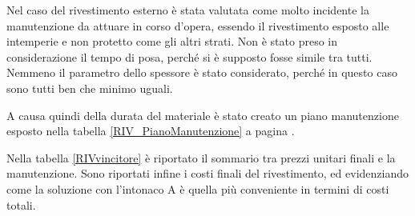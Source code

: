 Nel caso del rivestimento esterno è stata valutata come molto incidente la manutenzione da attuare in corso d'opera, essendo il rivestimento esposto alle intemperie e non protetto come gli altri strati. 
Non è stato preso in considerazione il tempo di posa, perché si è supposto fosse simile tra tutti.
Nemmeno il parametro dello spessore è stato considerato, perché in questo caso sono tutti ben che minimo uguali.

A causa quindi della durata del materiale è stato creato un piano manutenzione esposto nella tabella \ref{RIV_PianoManutenzione} a pagina \pageref{RIV_PianoManutenzione}.

Nella tabella \ref{RIVvincitore} è riportato il sommario tra prezzi unitari finali e la manutenzione. 
Sono riportati infine i costi finali del rivestimento, ed evidenziando come la soluzione con l'intonaco A è quella più conveniente in termini di costi totali.
